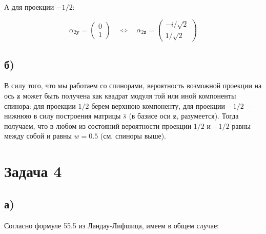 \documentclass[a4paper, 12pt]{article}
\newcommand{\qlrq}
{\ensuremath{\quad \Leftrightarrow \quad}} %
\begin{document}
А для проекции $-1/2$:

\begin{equation}
	\alpha_{2\mathbf{y}} = 
	\begin{pmatrix}
	0\\
	1
	\end{pmatrix}
	\qlrq \boxed{\alpha_{2\mathbf{z}} = 
	\begin{pmatrix}
	-i / \sqrt{2}\\
	1 / \sqrt{2}
	\end{pmatrix}}
\end{equation}

\subsection*{б)}

В силу того, что мы работаем со спинорами, вероятность возможной проекции на ось $\mathbf{z}$  может быть получена как квадрат модуля той или иной компоненты спинора: для проекции $1/2$ берем верхнюю компоненту, для проекции $-1/2$ --- нижнюю в силу построения матрицы $\hat{s}$ (в базисе оси $\mathbf{z}$, разумеется). Тогда получаем, что в любом из состояний вероятности проекции $1/2$ и $-1/2$ равны между собой и равны $\boxed{w = 0.5}$ (см. спиноры выше).

%
%
%
\section*{Задача 4}

\subsection*{а)}

Согласно формуле 55.5 из Ландау-Лифшица, имеем в общем случае:
\end{document}
